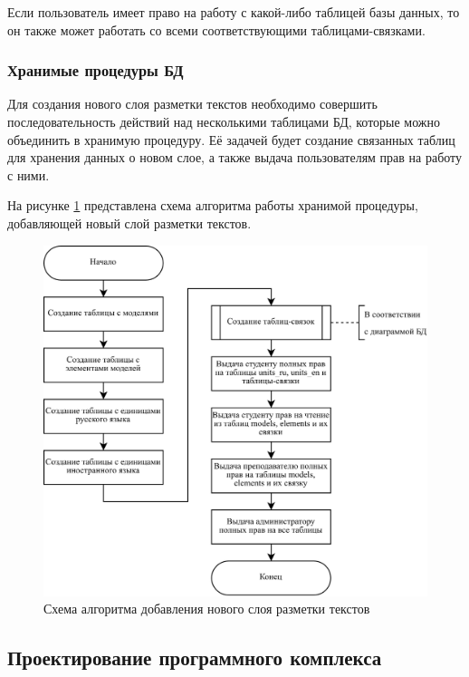 \clearpage

Если пользователь имеет право на работу с какой-либо таблицей базы данных, то он также может работать со всеми соответствующими таблицами-связками.

\subsubsection{Хранимые процедуры БД}

Для создания нового слоя разметки текстов необходимо совершить последовательность действий над несколькими таблицами БД, которые можно объединить в хранимую процедуру. Её задачей будет создание связанных таблиц для хранения данных о новом слое, а также выдача пользователям прав на работу с ними.

На рисунке \ref{fig:proc_alg} представлена схема алгоритма работы хранимой процедуры, добавляющей новый слой разметки текстов.

\begin{figure}[h]
	\centering
	\includegraphics[width=\textwidth ]{img/procedure_algorithm/procedure_algorithm.drawio.png}
	\caption{Схема алгоритма добавления нового слоя разметки текстов}
	\label{fig:proc_alg}
\end{figure} 

\clearpage



\subsection{Проектирование программного комплекса}

